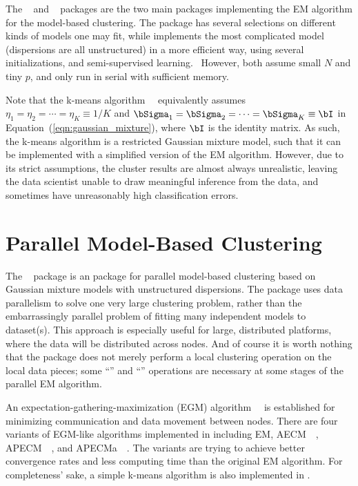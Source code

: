The ~\citep{mclust} and
~\citep{Chen2012EMClusterpackage}
packages are the two main  packages implementing the EM algorithm
for the model-based clustering.
The  package has several selections on different kinds of models
one may fit, while  
implements the most complicated model (dispersions are all unstructured)
in a more efficient way, using several initializations, and
semi-supervised learning.~
However, both assume small $N$ and tiny $p$, and only run in serial with
sufficient memory.

Note that the k-means algorithm~\citep{Forgy1965}~
equivalently assumes
$\eta_1 = \eta_2 = \cdots = \eta_K \equiv 1/K$ and
$\bSigma_1 = \bSigma_2 = \cdots = \bSigma_K \equiv \bI$
in Equation~(\ref{eqn:gaussian_mixture}), where
$\bI$ is the identity matrix.
As such, the k-means algorithm is a restricted Gaussian mixture model, such
that it can be implemented with a simplified version of the EM algorithm.
However, due to its strict assumptions, the cluster results are almost always
unrealistic, leaving the data scientist unable to draw meaningful inference
from the data, and sometimes have unreasonably high classification errors.


\section{Parallel Model-Based Clustering}
\label{sec:parallel_model_based_clustering}

The ~\citep{Chen2012pmclustpackage}
package is an 
package for parallel model-based clustering based on Gaussian mixture models
with unstructured dispersions. The package uses data parallelism to solve one
very large clustering problem, rather than the embarrassingly parallel
problem of fitting many independent models to dataset(s). This approach is
especially useful for large, distributed platforms, where the data will be
distributed across nodes. And of course it is worth nothing that the package
does not merely perform a local clustering operation on the local data
pieces; some ``'' and ``'' operations are necessary
at some stages of the parallel EM algorithm.

An expectation-gathering-maximization (EGM)
algorithm~\citep{Chen2013}~
is established for minimizing communication and data movement between nodes.
There are four variants of EGM-like algorithms implemented in 
including EM, AECM~\citep{Meng1997}~,
APECM~\citep{Chen2011}~, and
APECMa~\citep{Chen2013}~. The variants are trying to
achieve better convergence rates and less computing time than the original
EM algorithm. For completeness' sake, a simple k-means algorithm is also
implemented in .

